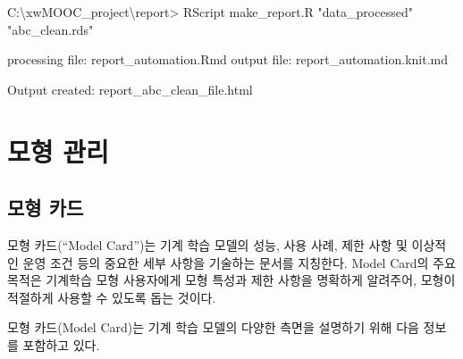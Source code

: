 \documentclass[
  letterpaper,
  chapter,a4paper,showtrims,openright,hidelinks]{oblivoir}
\newenvironment{Shaded}{\begin{snugshade}}{\end{snugshade}}
\newcommand{\NormalTok}[1]{\textcolor[rgb]{0.00,0.23,0.31}{#1}}
\newcommand{\SpecialCharTok}[1]{\textcolor[rgb]{0.37,0.37,0.37}{#1}}
\newcommand{\StringTok}[1]{\textcolor[rgb]{0.13,0.47,0.30}{#1}}
\begin{document}
\begin{Shaded}
\begin{Highlighting}[]
\NormalTok{C}\SpecialCharTok{:}\NormalTok{\textbackslash{}xwMOOC\_project\textbackslash{}report}\SpecialCharTok{\textgreater{}}\NormalTok{ RScript make\_report.R }\StringTok{"data\_processed"} \StringTok{"abc\_clean.rds"}

\NormalTok{processing file}\SpecialCharTok{:}\NormalTok{ report\_automation.Rmd}
\NormalTok{output file}\SpecialCharTok{:}\NormalTok{ report\_automation.knit.md}

\NormalTok{Output created}\SpecialCharTok{:}\NormalTok{ report\_abc\_clean\_file.html}
\end{Highlighting}
\end{Shaded}

\hypertarget{uxbaa8uxd615-uxad00uxb9ac}{%
\chapter{모형 관리}\label{uxbaa8uxd615-uxad00uxb9ac}}

\hypertarget{uxbaa8uxd615-uxce74uxb4dc}{%
\section{모형 카드}\label{uxbaa8uxd615-uxce74uxb4dc}}

모형 카드(``Model Card'')는 기계 학습 모델의 성능, 사용 사례, 제한 사항
및 이상적인 운영 조건 등의 중요한 세부 사항을 기술하는 문서를 지칭한다.
Model Card의 주요 목적은 기계학습 모형 사용자에게 모형 특성과 제한
사항을 명확하게 알려주어, 모형이 적절하게 사용할 수 있도록 돕는 것이다.

모형 카드(Model Card)는 기계 학습 모델의 다양한 측면을 설명하기 위해
다음 정보를 포함하고 있다.
\end{document}
